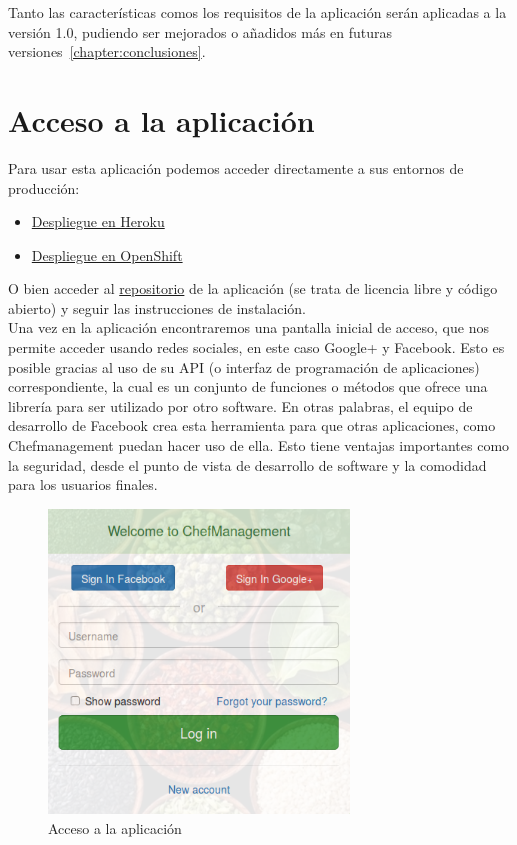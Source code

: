 Tanto las características comos los requisitos de la aplicación serán aplicadas a la versión 1.0, pudiendo ser mejorados o añadidos más en futuras versiones~\ref{chapter:conclusiones}.

\vspace*{0.2in}
\section{Acceso a la aplicación}\label{cap.2.1}

Para usar esta aplicación podemos acceder directamente a sus entornos de producción:
\begin{itemize}
	\item \href{http://chefmanagement.herokuapp.com/}{Despliegue en Heroku}
	\item \href{http://chefmanagement-esit.rhcloud.com/}{Despliegue en OpenShift}
\end{itemize}

O bien acceder al \href{https://github.com/alu0100207385/ChefManagement}{repositorio} de la aplicación (se trata de licencia libre y código abierto) y seguir las instrucciones de instalación. \\

Una vez en la aplicación encontraremos una pantalla inicial de acceso, que nos permite acceder usando redes sociales, en este caso Google+ y Facebook. Esto es posible gracias al uso de su API (o interfaz de programación de aplicaciones) correspondiente, la cual es un conjunto de funciones o métodos que ofrece una librería para ser utilizado por otro software. En otras palabras, el equipo de desarrollo de Facebook crea esta herramienta para que otras aplicaciones, como Chefmanagement puedan hacer uso de ella. Esto tiene ventajas importantes como la seguridad, desde el punto de vista de desarrollo de software y la comodidad para los usuarios finales. \\

\begin{figure}[H]
	\centering
	\includegraphics[width=8cm]{./images/chefmanagement-root.png}
	\caption{Acceso a la aplicación} \label{fig:chefmanagement-root}
\end{figure}

